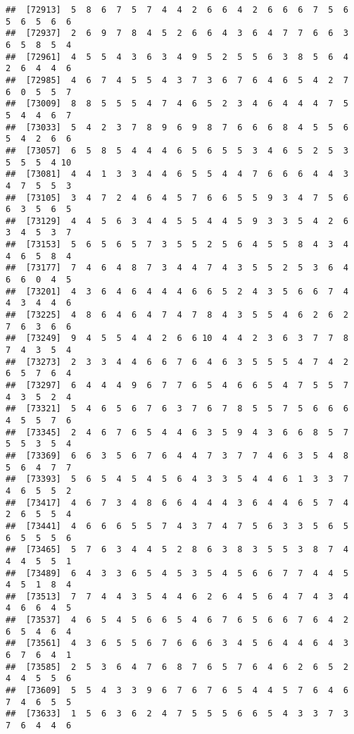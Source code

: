\documentclass[
]{book}
\begin{document}
\begin{verbatim}
##  [72913]  5  8  6  7  5  7  4  4  2  6  6  4  2  6  6  6  7  5  6  5  6  5  6  6
##  [72937]  2  6  9  7  8  4  5  2  6  6  4  3  6  4  7  7  6  6  3  6  5  8  5  4
##  [72961]  4  5  5  4  3  6  3  4  9  5  2  5  5  6  3  8  5  6  4  2  6  4  4  6
##  [72985]  4  6  7  4  5  5  4  3  7  3  6  7  6  4  6  5  4  2  7  6  0  5  5  7
##  [73009]  8  8  5  5  5  4  7  4  6  5  2  3  4  6  4  4  4  7  5  5  4  4  6  7
##  [73033]  5  4  2  3  7  8  9  6  9  8  7  6  6  6  8  4  5  5  6  5  4  2  6  6
##  [73057]  6  5  8  5  4  4  4  6  5  6  5  5  3  4  6  5  2  5  3  5  5  5  4 10
##  [73081]  4  4  1  3  3  4  4  6  5  5  4  4  7  6  6  6  4  4  3  4  7  5  5  3
##  [73105]  3  4  7  2  4  6  4  5  7  6  6  5  5  9  3  4  7  5  6  6  3  5  6  5
##  [73129]  4  4  5  6  3  4  4  5  5  4  4  5  9  3  3  5  4  2  6  3  4  5  3  7
##  [73153]  5  6  5  6  5  7  3  5  5  2  5  6  4  5  5  8  4  3  4  4  6  5  8  4
##  [73177]  7  4  6  4  8  7  3  4  4  7  4  3  5  5  2  5  3  6  4  6  6  0  4  5
##  [73201]  4  3  6  4  6  4  4  4  6  6  5  2  4  3  5  6  6  7  4  4  3  4  4  6
##  [73225]  4  8  6  4  6  4  7  4  7  8  4  3  5  5  4  6  2  6  2  7  6  3  6  6
##  [73249]  9  4  5  5  4  4  2  6  6 10  4  4  2  3  6  3  7  7  8  7  4  3  5  4
##  [73273]  2  3  3  4  4  6  6  7  6  4  6  3  5  5  5  4  7  4  2  6  5  7  6  4
##  [73297]  6  4  4  4  9  6  7  7  6  5  4  6  6  5  4  7  5  5  7  4  3  5  2  4
##  [73321]  5  4  6  5  6  7  6  3  7  6  7  8  5  5  7  5  6  6  6  4  5  5  7  6
##  [73345]  2  4  6  7  6  5  4  4  6  3  5  9  4  3  6  6  8  5  7  5  5  3  5  4
##  [73369]  6  6  3  5  6  7  6  4  4  7  3  7  7  4  6  3  5  4  8  5  6  4  7  7
##  [73393]  5  6  5  4  5  4  5  6  4  3  3  5  4  4  6  1  3  3  7  4  6  5  5  2
##  [73417]  4  6  7  3  4  8  6  6  4  4  4  3  6  4  4  6  5  7  4  2  6  5  5  4
##  [73441]  4  6  6  6  5  5  7  4  3  7  4  7  5  6  3  3  5  6  5  6  5  5  5  6
##  [73465]  5  7  6  3  4  4  5  2  8  6  3  8  3  5  5  3  8  7  4  4  4  5  5  1
##  [73489]  6  4  3  3  6  5  4  5  3  5  4  5  6  6  7  7  4  4  5  4  5  1  8  4
##  [73513]  7  7  4  4  3  5  4  4  6  2  6  4  5  6  4  7  4  3  4  4  6  6  4  5
##  [73537]  4  6  5  4  5  6  6  5  4  6  7  6  5  6  6  7  6  4  2  6  5  4  6  4
##  [73561]  4  3  6  5  5  6  7  6  6  6  3  4  5  6  4  4  6  4  3  6  7  6  4  1
##  [73585]  2  5  3  6  4  7  6  8  7  6  5  7  6  4  6  2  6  5  2  4  4  5  5  6
##  [73609]  5  5  4  3  3  9  6  7  6  7  6  5  4  4  5  7  6  4  6  7  4  6  5  5
##  [73633]  1  5  6  3  6  2  4  7  5  5  5  6  6  5  4  3  3  7  3  7  6  4  4  6

\end{verbatim}
\end{document}
